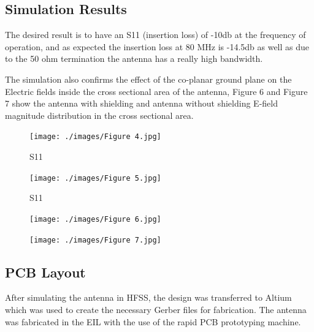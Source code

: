 \subsection{Simulation Results}

The desired result is to have an S11 (insertion loss) of -10db at the frequency of operation, and as expected the insertion loss at 80 MHz is -14.5db as well as due to the 50 ohm termination the antenna has a really high bandwidth.

The simulation also confirms the effect of the co-planar ground plane on the Electric fields inside the cross sectional area of the antenna, Figure 6 and Figure 7 show the antenna with shielding and antenna without shielding E-field magnitude distribution in the cross sectional area.

\begin{figure}[h]
	\begin{center}
		\texttt{[image: ./images/Figure 4.jpg]}
		\caption{S11}
		\label{fig:hfield_fig4}
	\end{center}
\end{figure}

\begin{figure}[h]
	\begin{center}
		\texttt{[image: ./images/Figure 5.jpg]}
		\caption{S11}
		\label{fig:hfield_fig5}
	\end{center}
\end{figure}

\begin{figure}[h]
	\begin{center}
		\texttt{[image: ./images/Figure 6.jpg]}
		\caption{}
		\label{fig:hfield_fig6}
	\end{center}
\end{figure}

\begin{figure}[h]
	\begin{center}
		\texttt{[image: ./images/Figure 7.jpg]}
		\caption{}
		\label{fig:hfield_fig7}
	\end{center}
\end{figure}

\subsection{PCB Layout}

After simulating the antenna in HFSS, the design was transferred to Altium which was used to create the necessary Gerber files for fabrication. The antenna was fabricated in the EIL with the use of the rapid PCB prototyping machine. 

